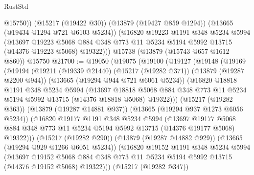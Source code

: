 \begin{lexlean}{RustStd}
\begin{coremodule}
          @15750))
      (@15217 (@19422 @30))
      (@13879 (@19427 @859 @1294))
      (@13665 (@19434 @1294 @721 @6103 @5234))
      (@16820
        @19223
        @1191
        @348
        @5234
        @5994
        (@13697
          @19223
          @5068
          @884
          @348
          @773
          @11
          @5234
          @5194
          @5992
          @13715
          (@14376 @19223 @5068)
          @19322)))
    @15738
    (@13879 (@15743 @657 @1612 @860))
    @15750
@21700 := @19050
    (@19075
      (@19100
        (@19127
          (@19148
            (@19169
              (@19194
                (@19211
                  (@19339 @21440)
                  (@15217 (@19282 @371))
                  (@13879 (@19287 @2200 @944))
                  (@13665 (@19294 @944 @721 @6061 @5234))
                  (@16820
                    @18818
                    @1191
                    @348
                    @5234
                    @5994
                    (@13697
                      @18818
                      @5068
                      @884
                      @348
                      @773
                      @11
                      @5234
                      @5194
                      @5992
                      @13715
                      (@14376 @18818 @5068)
                      @19322)))
                (@15217 (@19282 @363))
                (@13879 (@19287 @14881 @937))
                (@13665 (@19294 @937 @1273 @6056 @5234))
                (@16820
                  @19177
                  @1191
                  @348
                  @5234
                  @5994
                  (@13697
                    @19177
                    @5068
                    @884
                    @348
                    @773
                    @11
                    @5234
                    @5194
                    @5992
                    @13715
                    (@14376 @19177 @5068)
                    @19322)))
              (@15217 (@19282 @290))
              (@13879 (@19287 @14882 @929))
              (@13665 (@19294 @929 @1266 @6051 @5234))
              (@16820
                @19152
                @1191
                @348
                @5234
                @5994
                (@13697
                  @19152
                  @5068
                  @884
                  @348
                  @773
                  @11
                  @5234
                  @5194
                  @5992
                  @13715
                  (@14376 @19152 @5068)
                  @19322)))
            (@15217 (@19282 @347))

\end{coremodule}
\end{lexlean}
